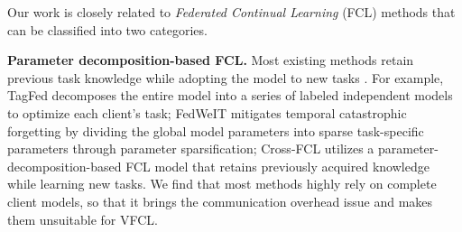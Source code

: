 Our work is closely related to \textit{Federated Continual Learning} (FCL) methods that can be classified into two categories. 

\noindent\textbf{Parameter decomposition-based FCL.}
Most existing methods retain previous task knowledge while adopting the model to new tasks \cite{yang2024federated}. 
For example, TagFed \cite{wang2024traceable} decomposes the entire model into a series of labeled independent models to optimize each client’s task; FedWeIT \cite{yoon2021federated} mitigates temporal catastrophic forgetting by dividing the global model parameters into sparse task-specific parameters through parameter sparsification; Cross-FCL \cite{zhang2022cross} utilizes a parameter-decomposition-based FCL model that retains previously acquired knowledge while learning new tasks. 
We find that most methods highly rely on complete client models, so that it brings the communication overhead issue and makes them unsuitable for VFCL. 



